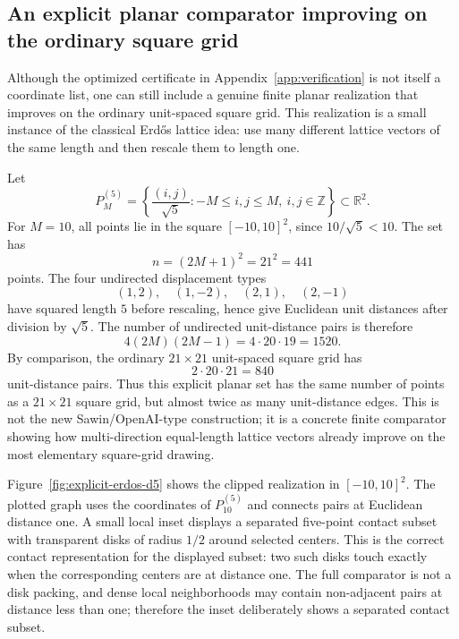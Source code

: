\documentclass[a4paper,12pt]{article}
\begin{document}
\subsection{An explicit planar comparator improving on the ordinary square grid}\label{subsec:explicit-comparator}

Although the optimized certificate in Appendix~\ref{app:verification} is not itself a coordinate list, one can still include a genuine finite planar realization that improves on the ordinary unit-spaced square grid.  This realization is a small instance of the classical Erd\H{o}s lattice idea: use many different lattice vectors of the same length and then rescale them to length one.

Let
\[
P_M^{(5)}=\left\{\frac{(i,j)}{\sqrt{5}}:-M\le i,j\le M,\ i,j\in\mathbb Z\right\}\subset\mathbb R^2.
\]
For $M=10$, all points lie in the square $[-10,10]^2$, since $10/\sqrt{5}<10$.  The set has
\[
 n=(2M+1)^2=21^2=441
\]
points.  The four undirected displacement types
\[
(1,2),\quad (1,-2),\quad (2,1),\quad (2,-1)
\]
have squared length $5$ before rescaling, hence give Euclidean unit distances after division by $\sqrt{5}$.  The number of undirected unit-distance pairs is therefore
\[
4(2M)(2M-1)=4\cdot 20\cdot 19=1520.
\]
By comparison, the ordinary $21\times21$ unit-spaced square grid has
\[
2\cdot 20\cdot 21=840
\]
unit-distance pairs.  Thus this explicit planar set has the same number of points as a $21\times21$ square grid, but almost twice as many unit-distance edges.  This is not the new Sawin/OpenAI-type construction; it is a concrete finite comparator showing how multi-direction equal-length lattice vectors already improve on the most elementary square-grid drawing.

Figure~\ref{fig:explicit-erdos-d5} shows the clipped realization in $[-10,10]^2$.  The plotted graph uses the coordinates of $P_{10}^{(5)}$ and connects pairs at Euclidean distance one.  A small local inset displays a separated five-point contact subset with transparent disks of radius $1/2$ around selected centers.  This is the correct contact representation for the displayed subset: two such disks touch exactly when the corresponding centers are at distance one.  The full comparator is not a disk packing, and dense local neighborhoods may contain non-adjacent pairs at distance less than one; therefore the inset deliberately shows a separated contact subset.
\end{document}
